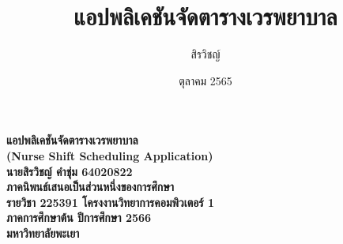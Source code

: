 \documentclass[a4paper,12pt]{upthesis}
\title{  						%
แอปพลิเคชันจัดตารางเวรพยาบาล
}
\author{สิรวิชญ์}{คำชุ่ม}
\date{ตุลาคม 2565}                                               %
\begin{document}

\thispagestyle{empty}
\begin{center} %
\Large{\textbf{แอปพลิเคชันจัดตารางเวรพยาบาล\\
(Nurse Shift Scheduling Application)\\}}
\vspace{8cm}
\textbf{นายสิรวิชญ์ คำชุ่ม \hspace{0cm} 64020822\\} %
\vspace{8cm}
\textbf{ภาคนิพนธ์เสนอเป็นส่วนหนึ่งของการศึกษา\\
รายวิชา 225391 โครงงานวิทยาการคอมพิวเตอร์ 1\\
ภาคการศึกษาต้น ปีการศึกษา 2566\\
มหาวิทยาลัยพะเยา}
\end{center}





\end{document}
